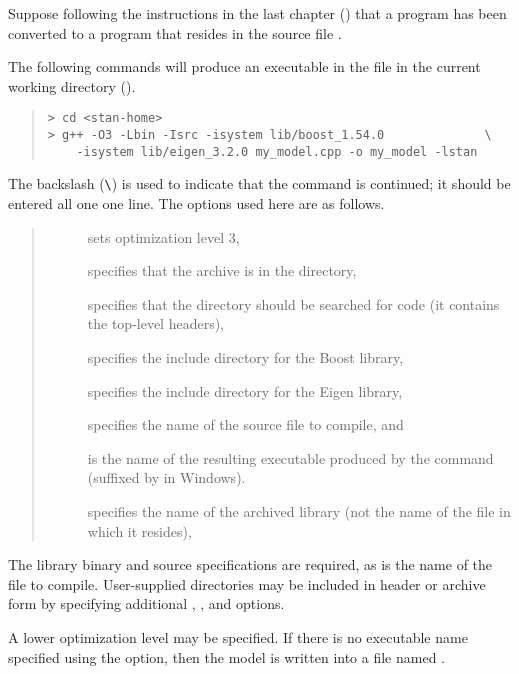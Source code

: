 Suppose following the instructions in the last chapter
() that a \Stan program has been converted to a \Cpp
program that resides in the source file .

The following commands will produce an executable in the file
 in the current working directory ().
%
\begin{quote}
\begin{Verbatim}[fontshape=sl]
> cd <stan-home>
> g++ -O3 -Lbin -Isrc -isystem lib/boost_1.54.0              \
    -isystem lib/eigen_3.2.0 my_model.cpp -o my_model -lstan
\end{Verbatim}
\end{quote} %
The backslash (\Verb|\|) is used to indicate that the command is
continued; it should be entered all one one line.
%
The options used here are as follows.
\begin{quote}
\begin{description}
\item[] sets optimization level 3,
\item[] specifies that the archive is in the 
  directory,
\item[] specifies that the directory  should be
  searched for code (it contains the top-level \Stan headers),
\item[] specifies the include directory for the 
  Boost library,
\item[] specifies the include directory for
  the Eigen library,
\item[] specifies the name of the source file to
  compile, and 
\item[] is the name of the resulting executable
  produced by the command (suffixed by \code{.exe} in Windows).
\item[] specifies the name of the archived library (not
  the name of the file in which it resides),
\end{description}
\end{quote}
%
The library binary and source specifications are required, as is the
name of the \Cpp file to compile.  User-supplied directories may be
included in header or archive form by specifying additional ,
\code{-l}, and \code{-I} options.
 
A lower optimization level may be specified.  If there is no
executable name specified using the  option, then the model
is written into a file named \code{a.out}.
 

